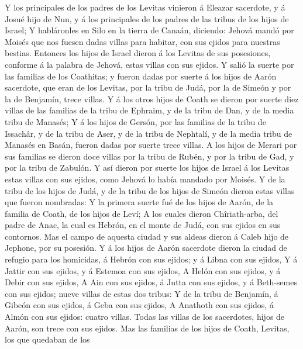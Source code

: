  Y los principales de los padres de los Levitas vinieron á
Eleazar sacerdote, y á Josué hijo de Nun, y á los principales de los
padres de las tribus de los hijos de Israel;  Y
habláronles en Silo en la tierra de Canaán, diciendo: Jehová mandó por
Moisés que nos fuesen dadas villas para habitar, con sus ejidos para
nuestras bestias.  Entonces los hijos de Israel dieron á
los Levitas de sus posesiones, conforme á la palabra de Jehová, estas
villas con sus ejidos.  Y salió la suerte por las familias
de los Coathitas; y fueron dadas por suerte á los hijos de Aarón
sacerdote, que eran de los Levitas, por la tribu de Judá, por la de
Simeón y por la de Benjamín, trece villas.  Y á los otros
hijos de Coath se dieron por suerte diez villas de las familias de la
tribu de Ephraim, y de la tribu de Dan, y de la media tribu de Manasés;
 Y á los hijos de Gersón, por las familias de la tribu de
Issachâr, y de la tribu de Aser, y de la tribu de Nephtalí, y de la
media tribu de Manasés en Basán, fueron dadas por suerte trece villas.
 A los hijos de Merari por sus familias se dieron doce
villas por la tribu de Rubén, y por la tribu de Gad, y por la tribu de
Zabulón.  Y así dieron por suerte los hijos de Israel á
los Levitas estas villas con sus ejidos, como Jehová lo había mandado
por Moisés.  Y de la tribu de los hijos de Judá, y de la
tribu de los hijos de Simeón dieron estas villas que fueron nombradas:
 Y la primera suerte fué de los hijos de Aarón, de la
familia de Coath, de los hijos de Leví;  A los cuales
dieron Chîriath-arba, del padre de Anac, la cual es Hebrón, en el monte
de Judá, con sus ejidos en sus contornos.  Mas el campo
de aquesta ciudad y sus aldeas dieron á Caleb hijo de Jephone, por su
posesión.  Y á los hijos de Aarón sacerdote dieron la
ciudad de refugio para los homicidas, á Hebrón con sus ejidos; y á Libna
con sus ejidos,  Y á Jattir con sus ejidos, y á Estemoa
con sus ejidos,  A Helón con sus ejidos, y á Debir con
sus ejidos,  A Ain con sus ejidos, á Jutta con sus
ejidos, y á Beth-semes con sus ejidos; nueve villas de estas dos tribus:
 Y de la tribu de Benjamín, á Gibeón con sus ejidos, á
Geba con sus ejidos,  A Anathoth con sus ejidos, á Almón
con sus ejidos: cuatro villas.  Todas las villas de los
sacerdotes, hijos de Aarón, son trece con sus ejidos. 
Mas las familias de los hijos de Coath, Levitas, los que quedaban de los
